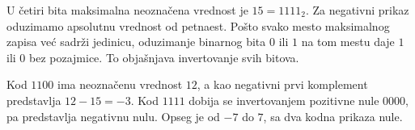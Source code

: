 
U četiri bita maksimalna neoznačena vrednost je $15=1111_2$. Za negativni prikaz oduzimamo apsolutnu vrednost od petnaest. Pošto svako mesto maksimalnog zapisa već sadrži jedinicu, oduzimanje binarnog bita $0$ ili $1$ na tom mestu daje $1$ ili $0$ bez pozajmice. To objašnjava invertovanje svih bitova.

Kod $1100$ ima neoznačenu vrednost $12$, a kao negativni prvi komplement predstavlja $12-15=-3$. Kod $1111$ dobija se invertovanjem pozitivne nule $0000$, pa predstavlja negativnu nulu. Opseg je od $-7$ do $7$, sa dva kodna prikaza nule.
